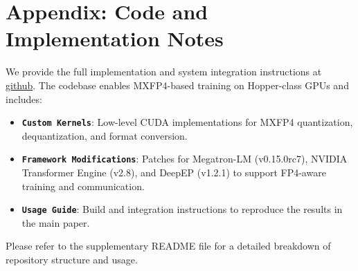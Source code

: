 \section{Appendix: Code and Implementation Notes}
\label{sec:appendix-code}

We provide the full implementation and system integration instructions at \href{https://github.com/anonymous-git-2026/MXFP4-Hopper}{github}. 
The codebase enables MXFP4-based training on Hopper-class GPUs and includes:

\begin{itemize}
\item \textbf{\texttt{Custom Kernels}}: Low-level CUDA implementations for MXFP4 quantization, dequantization, and format conversion.
\item \textbf{\texttt{Framework Modifications}}: Patches for Megatron-LM (v0.15.0rc7), NVIDIA Transformer Engine (v2.8), and DeepEP (v1.2.1) to support FP4-aware training and communication.
\item \textbf{\texttt{Usage Guide}}: Build and integration instructions to reproduce the results in the main paper.
\end{itemize}

Please refer to the supplementary README file for a detailed breakdown of repository structure and usage.